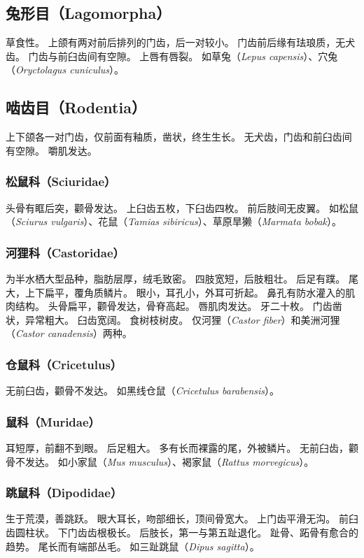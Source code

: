 \documentclass[11pt]{article}
\begin{document}
\subsection{兔形目（Lagomorpha）}
草食性。
上颌有两对前后排列的门齿，后一对较小。
门齿前后缘有珐琅质，无犬齿。
门齿与前臼齿间有空隙。
上唇有唇裂。
如草兔（\textit{Lepus capensis}）、穴兔（\textit{Oryctolagus cuniculus}）。

\subsection{啮齿目（Rodentia）}
上下颌各一对门齿，仅前面有釉质，凿状，终生生长。
无犬齿，门齿和前臼齿间有空隙。
嚼肌发达。

\subsubsection{松鼠科（Sciuridae）}
头骨有眶后突，颧骨发达。
上臼齿五枚，下臼齿四枚。
前后肢间无皮翼。
如松鼠（\textit{Sciurus vulgaris}）、花鼠（\textit{Tamias sibiricus}）、草原旱獭（\textit{Marmata bobak}）。

\subsubsection{河狸科（Castoridae）}
为半水栖大型品种，脂肪层厚，绒毛致密。
四肢宽短，后肢粗壮。
后足有蹼。
尾大，上下扁平，覆角质鳞片。
眼小，耳孔小，外耳可折起。
鼻孔有防水灌入的肌肉结构。
头骨扁平，颧骨发达，骨脊高起。
唇肌肉发达。
牙二十枚。
门齿凿状，异常粗大。
臼齿宽阔。
食树枝树皮。
仅河狸（\textit{Castor fiber}）和美洲河狸（\textit{Castor canadensis}）两种。

\subsubsection{仓鼠科（Cricetulus）}
无前臼齿，颧骨不发达。
如黑线仓鼠（\textit{Cricetulus barabensis}）。

\subsubsection{鼠科（Muridae）}
耳短厚，前翻不到眼。
后足粗大。
多有长而裸露的尾，外被鳞片。
无前臼齿，颧骨不发达。
如小家鼠（\textit{Mus musculus}）、褐家鼠（\textit{Rattus morvegicus}）。

\subsubsection{跳鼠科（Dipodidae）}
生于荒漠，善跳跃。
眼大耳长，吻部细长，顶间骨宽大。
上门齿平滑无沟。
前臼齿圆柱状。
下门齿齿根极长。
后肢长，第一与第五趾退化。
趾骨、跖骨有愈合的趋势。
尾长而有端部丛毛。
如三趾跳鼠（\textit{Dipus sagitta}）。
\end{document}
